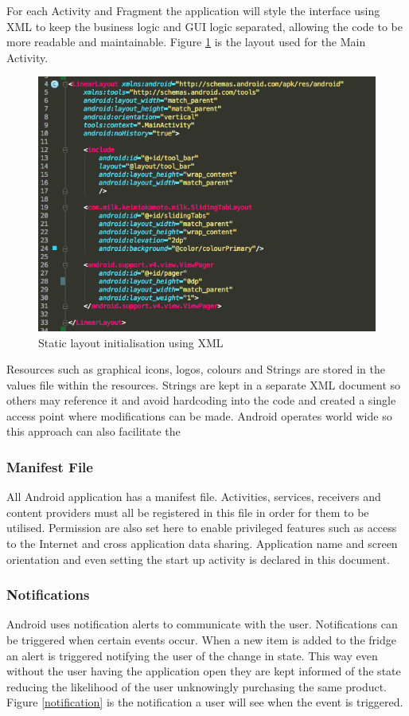 \documentclass[a4paper, 11pt]{article}
\begin{document}
For each Activity and Fragment the application will style the interface using XML to keep the business logic and GUI logic separated, allowing the code to be more readable and maintainable. Figure \ref{fig:xml} is the layout used for the Main Activity. 

\begin{figure}[!htbp]
\centering
\includegraphics[width=\textwidth]{xml}
\caption{Static layout initialisation using XML} \label{fig:xml}
\end{figure}


Resources such as graphical icons, logos, colours and Strings are stored in the values file within the resources. Strings are kept in a separate XML document so others may reference it and avoid hardcoding into the code and created a single access point where modifications can be made. Android operates world wide so this approach can also facilitate the 

\subsubsection{Manifest File}
All Android application has a manifest file. Activities, services, receivers and content providers must all be registered in this file in order for them to be utilised. Permission are also set here to enable privileged features such as access to the Internet and cross application data sharing. Application name and screen orientation and even setting the start up activity is declared in this document.

\subsubsection{Notifications}
Android uses notification alerts to communicate with the user. Notifications can be triggered when certain events occur. When a new item is added to the fridge an alert is triggered notifying the user of the change in state. This way even without the user having the application open they are kept informed of the state reducing the likelihood of the user unknowingly purchasing the same product. Figure \ref{notification} is the notification a user will see when the event is triggered.
\end{document}
